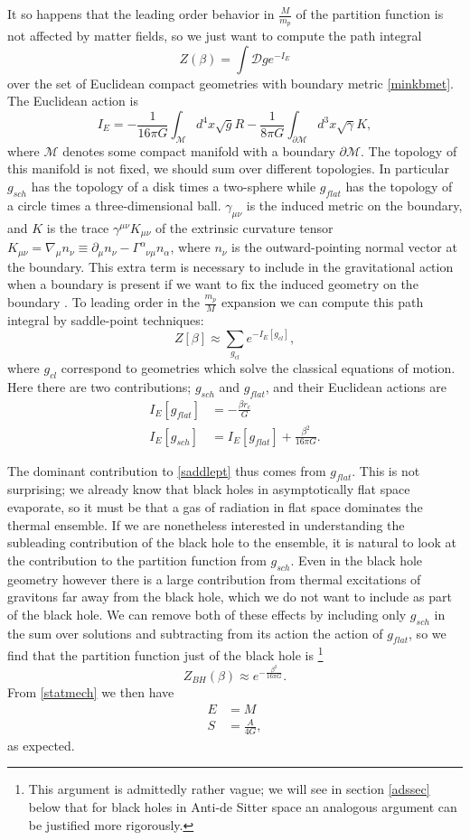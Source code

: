 \documentclass[12pt]{article}
\newcommand{\be}{\begin{equation}}
\newcommand{\ee}{\end{equation}}
\begin{document}
It so happens that the leading order behavior in $\frac{M}{m_p}$ of the partition function is not affected by matter fields, so we just want to compute the path integral 
\be
Z(\beta)=\int \mathcal{D}g e^{-I_E}
\ee 
over the set of Euclidean compact geometries with boundary metric \eqref{minkbmet}.  The Euclidean action is
\be\label{eucact}
I_E=-\frac{1}{16\pi G}\int_{\mathcal{M}} d^4x \sqrt{g}R-\frac{1}{8\pi G}\int_{\partial \mathcal{M}} d^{3}x \sqrt{\gamma}K,
\ee
where $\mathcal{M}$ denotes some compact manifold with a boundary $\partial \mathcal{M}$.  The topology of this manifold is not fixed, we should sum over different topologies.  In particular $g_{sch}$ has the topology of a disk times a two-sphere while $g_{flat}$ has the topology of a circle times a three-dimensional ball.  $\gamma_{\mu\nu}$ is the induced metric on the boundary, and $K$ is the trace $\gamma^{\mu\nu}K_{\mu\nu}$ of the extrinsic curvature tensor $K_{\mu\nu}=\nabla_\mu n_\nu\equiv \partial_\mu n_\nu-\Gamma^\alpha_{\phantom{\alpha}\nu\mu} n_\alpha$, where $n_\nu$ is the outward-pointing normal vector at the boundary.  This extra term is necessary to include in the gravitational action when a boundary is present if we want to fix the induced geometry on the boundary \cite{Gibbons:1976ue}.  To leading order in the $\frac{m_p}{M}$ expansion we can compute this path integral by saddle-point techniques: 
\be\label{saddlept}
Z[\beta]\approx \sum_{g_{cl}} e^{-I_E[g_{cl}]},
\ee
where $g_{cl}$ correspond to geometries which solve the classical equations of motion. Here there are two contributions; $g_{sch}$ and $g_{flat}$,  and their Euclidean actions are
\begin{align}\nonumber
I_E[g_{flat}]&=-\frac{\beta r_c}{G}\\
I_E[g_{sch}]&=I_E[g_{flat}]+\frac{\beta^2}{16\pi G}.
\end{align}

The dominant contribution to \eqref{saddlept} thus comes from $g_{flat}$.  This is not surprising; we already know that black holes in asymptotically flat space evaporate, so it must be that a gas of radiation in flat space dominates the thermal ensemble.  If we are nonetheless interested in understanding the subleading contribution of the black hole to the ensemble, it is natural to look at the contribution to the partition function from $g_{sch}$.  Even in the black hole geometry however there is a large contribution from thermal excitations of gravitons far away from the black hole, which we do not want to include as part of the black hole.  We can remove both of these effects by including only $g_{sch}$ in the sum over solutions and subtracting from its action the action of $g_{flat}$, so we find that the partition function just of the black hole is \cite{Gibbons:1976ue}\footnote{This argument is admittedly rather vague; we will see in section \ref{adssec} below that for black holes in Anti-de Sitter space an analogous argument can be justified more rigorously.}
\be
Z_{BH}(\beta)\approx e^{-\frac{\beta^2}{16\pi G}}.
\ee
From \eqref{statmech} we then have
\begin{align}\nonumber
E&=M\\
S&=\frac{A}{4G},
\end{align}
as expected.  
\end{document}
